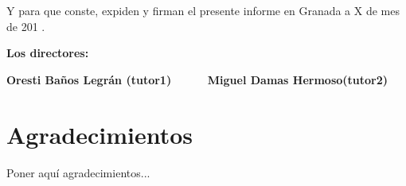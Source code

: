 \vspace{0.5cm}

Y para que conste, expiden y firman el presente informe en Granada a X de mes de 201 .

\vspace{1cm}

\textbf{Los directores:}

\vspace{5cm}

\noindent \textbf{Oresti Baños Legrán (tutor1) \ \ \ \ \ Miguel Damas Hermoso(tutor2)}

\chapter*{Agradecimientos}
\thispagestyle{empty}

       \vspace{1cm}


Poner aquí agradecimientos...

